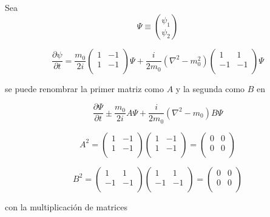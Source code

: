 \documentclass{report}
\begin{document}
Sea \[ \Psi \equiv \binom{\psi_{1}}{\psi_{2}}\]


\[\frac{\partial \psi}{\partial t} = \frac{m_0}{2i} \left ( \begin{array}{cc}
 1 & -1  \\
 1 & -1 \\ \end{array} \right) \Psi + \frac{i}{2 m_0} (\nabla^2 - m_{0}^2) \left ( \begin{array}{cc}
 1 & 1  \\
 -1 & -1 \\ \end{array} \right) \Psi \]

se puede renombrar la primer matriz como $A$ y la segunda como $B$ en

\begin{equation}
\frac{\partial \Psi}{\partial t} \pm \frac{m_0}{2i} A \Psi + \frac{i}{2 m_0} (\nabla ^2 - m_0) B \Psi
\end{equation}

\[A^2 = \left ( \begin{array}{cc}
 1 & -1  \\
 1 & -1 \\ \end{array} \right) \left ( \begin{array}{cc}
 1 & -1  \\
 1 & -1 \\ \end{array} \right) 
 = \left ( \begin{array}{cc}
 0 & 0  \\
 0 & 0 \\ \end{array} \right)\]

\[B^2 = \left ( \begin{array}{cc}
 1 & 1  \\
 -1 & -1 \\ \end{array} \right) \left ( \begin{array}{cc}
 1 & 1  \\
 -1 & -1 \\ \end{array} \right) 
 = \left ( \begin{array}{cc}
 0 & 0  \\
 0 & 0 \\ \end{array} \right)\]

con la multiplicación de matrices 
\end{document}
